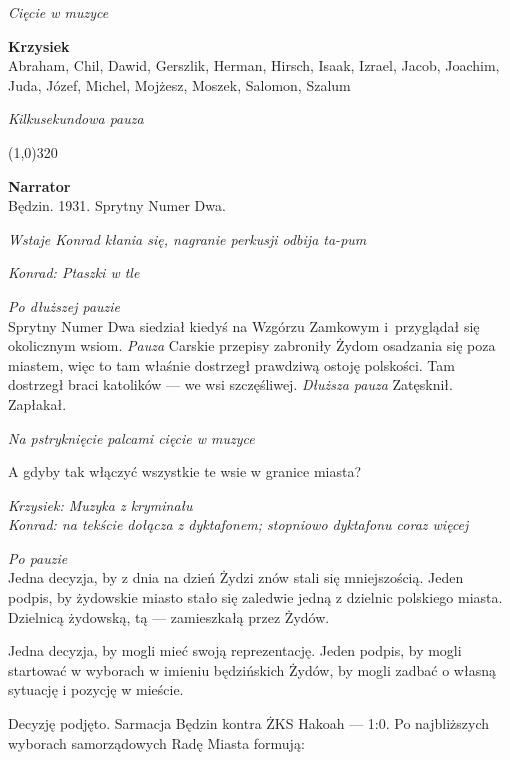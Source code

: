 \documentclass[11pt,a4paper,oneside]{article}
\begin{document}
{\color{light-gray} \emph{Cięcie w muzyce}}

{\color{krzysiek}
\textbf{Krzysiek}\\
Abraham, Chil, Dawid, Gerszlik, Herman, Hirsch, Isaak, Izrael, Jacob,
Joachim, Juda, Józef, Michel, Mojżesz, Moszek, Salomon, Szalum
}

{\color{light-gray} \emph{Kilkusekundowa pauza}}

\line(1,0){320}

 
\textbf{Narrator}\\
Będzin. 1931. Sprytny Numer Dwa. 

{\color{light-gray} \emph{Wstaje Konrad kłania się, nagranie perkusji odbija
ta-pum}}

{\color{konrad} \emph{Konrad: Ptaszki w tle}}

{\color{light-gray} \emph{Po dłuższej pauzie}}\\
Sprytny Numer Dwa siedział kiedyś na Wzgórzu Zamkowym i~przyglądał się
okolicznym wsiom. {\color{light-gray} \emph{Pauza}} Carskie przepisy
zabroniły Żydom osadzania się poza miastem, więc to tam właśnie
dostrzegł prawdziwą ostoję polskości. Tam dostrzegł braci katolików
--- we wsi szczęśliwej.  {\color{light-gray} \emph{Dłuższa pauza}}
Zatęsknił. Zapłakał.

{\color{light-gray} \emph{Na pstryknięcie palcami cięcie w muzyce}}

A gdyby tak włączyć wszystkie te wsie w granice miasta?

{\color{krzysiek} \emph{Krzysiek: Muzyka z kryminału}}\\
{\color{konrad} \emph{Konrad: na tekście dołącza z dyktafonem; stopniowo
dyktafonu coraz więcej}}

{\color{light-gray} \emph{Po pauzie}}\\
Jedna decyzja, by z dnia na dzień Żydzi znów stali się mniejszością.
Jeden podpis, by żydowskie miasto stało się zaledwie jedną z dzielnic
polskiego miasta.  Dzielnicą żydowską, tą --- zamieszkałą przez Żydów. 

Jedna decyzja, by mogli mieć swoją reprezentację. Jeden podpis, by %
mogli startować w wyborach w imieniu będzińskich Żydów, by mogli
zadbać o własną sytuację i pozycję w mieście. 

Decyzję podjęto. Sarmacja Będzin kontra ŻKS Hakoah --- 1:0. Po
najbliższych wyborach samorządowych Radę Miasta formują:
\end{document}
